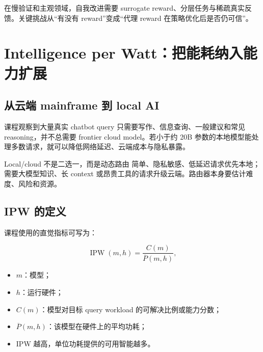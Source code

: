 \documentclass[a4paper]{article}
\begin{document}
在慢验证和主观领域，自我改进需要 surrogate reward、分层任务与稀疏真实反馈。关键挑战从“有没有 reward”变成“代理 reward 在策略优化后是否仍可信”。

\section{Intelligence per Watt：把能耗纳入能力扩展}

\subsection{从云端 mainframe 到 local AI}



课程观察到大量真实 chatbot query 只需要写作、信息查询、一般建议和常见 reasoning，并不总需要 frontier cloud model。若小于约 20B 参数的本地模型能处理多数请求，就可以降低网络延迟、云端成本与隐私暴露。



\begin{importantbox}{Local/cloud 不是二选一，而是动态路由}
简单、隐私敏感、低延迟请求优先本地；需要大模型知识、长 context 或昂贵工具的请求升级云端。路由器本身要估计难度、风险和资源。
\end{importantbox}

\subsection{IPW 的定义}


课程使用的直觉指标可写为：

$$
\operatorname{IPW}(m,h)=
\frac{C(m)}{\overline P(m,h)},
$$

\begin{itemize}
    \item $m$：模型；
    \item $h$：运行硬件；
    \item $C(m)$：模型对目标 query workload 的可解决比例或能力分数；
    \item $\overline P(m,h)$：该模型在硬件上的平均功耗；
    \item IPW 越高，单位功耗提供的可用智能越多。
\end{itemize}
\end{document}
